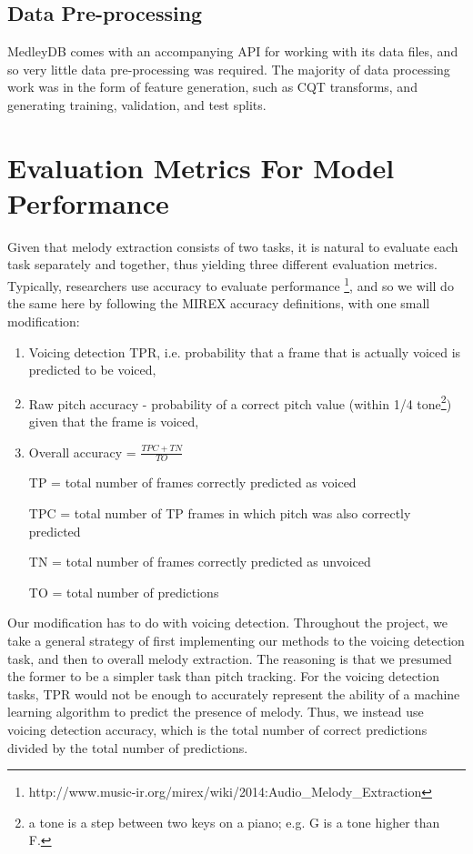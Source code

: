 \documentclass{article} %
\begin{document}
\subsection{Data Pre-processing}

MedleyDB comes with an accompanying API for working with its data files, and so very little data pre-processing was required.  The majority of data processing work was in the form of feature generation, such as CQT transforms, and generating training, validation, and test splits.

\section{Evaluation Metrics For Model Performance}
Given that melody extraction consists of two tasks, it is natural to evaluate each task separately and together, thus yielding three different evaluation metrics.  Typically, researchers use accuracy to evaluate performance \footnote{http://www.music-ir.org/mirex/wiki/2014:Audio\_Melody\_Extraction}, and so we will do the same here by following the MIREX accuracy definitions, with one small modification:

\begin{enumerate}
\item Voicing detection TPR, i.e. probability that a frame that is actually voiced is predicted to be voiced,
\item Raw pitch accuracy - probability of a correct pitch value (within 1/4 tone\footnote{a tone is a step between two keys on a piano; e.g. G is a tone higher than F.}) given that the frame is voiced,
\item Overall accuracy = $\frac{TPC+TN}{TO}$


TP = total number of frames correctly predicted as voiced

TPC = total number of TP frames in which pitch was also correctly predicted

TN = total number of frames correctly predicted as unvoiced

TO = total number of predictions

\end{enumerate}

Our modification has to do with voicing detection.  Throughout the project, we take a general strategy of first implementing our methods to the voicing detection task, and then to overall melody extraction.  The reasoning is that we presumed the former to be a simpler task than pitch tracking. For the voicing detection tasks, TPR would not be enough to accurately represent the ability of a machine learning algorithm to predict the presence of melody.  Thus, we instead use voicing detection accuracy, which is the total number of correct predictions divided by the total number of predictions.
\end{document}
